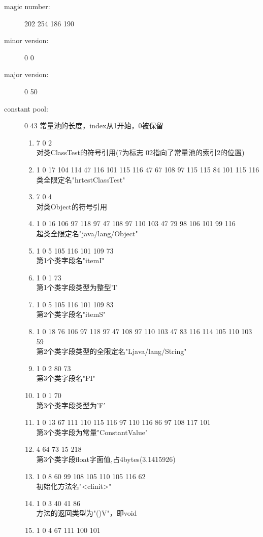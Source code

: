 \begin{description}
\item[magic number:] 202 254 186 190
\item[minor version:] 0 0
\item[major version:] 0 50
\item[constant pool:] 0 43 常量池的长度，index从1开始，0被保留
	\begin{enumerate}
	\item 7 0 2\\
		对类ClassTest的符号引用(7为标志  02指向了常量池的索引2的位置)
	\item 1 0 17 104 114 47 116 101 115 116 47 67 108 97 115 115 84 101 115 116\\
		类全限定名"hr\bs test\bs ClassTest"
	\item 7 0 4\\
		对类Object的符号引用
	\item 1 0 16 106 97 118 97 47 108 97 110 103 47 79 98 106 101 99 116\\
		超类全限定名"java/lang/Object"
	\item 1 0 5 105 116 101 109 73\\
		第1个类字段名"itemI"
	\item 1 0 1 73\\
		第1个类字段类型为整型'I'
	\item 1 0 5 105 116 101 109 83\\
		第2个类字段名"itemS"
	\item 1 0 18 76 106 97 118 97 47 108 97 110 103 47 83 116 114 105 110 103 59\\
		第2个类字段类型的全限定名"Ljava/lang/String"
	\item 1 0 2 80 73\\
		第3个类字段名"PI"
	\item 1 0 1 70\\
		第3个类字段类型为'F'
	\item 1 0 13 67 111 110 115 116 97 110 116 86 97 108 117 101\\
		第3个类字段为常量"ConstantValue"
	\item 4 64 73 15 218\\
		第3个类字段float字面值,占4bytes(3.1415926)
	\item 1 0 8 60 99 108 105 110 105 116 62\\
		初始化方法名"<clinit>"
	\item 1 0 3 40 41 86\\
		方法的返回类型为"()V"，即void
	\item 1 0 4 67 111 100 101\\

\end{enumerate}
\end{description}
